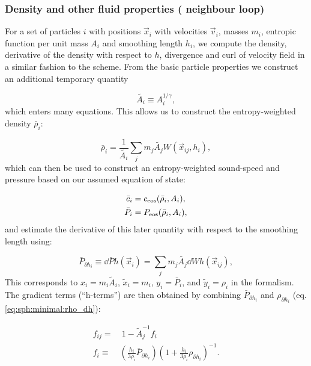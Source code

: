 \subsubsection{Density and other fluid properties ( neighbour loop)}

For a set of particles $i$ with positions $\vec{x}_i$ with velocities
$\vec{v}_i$, masses $m_i$, entropic function per unit mass $A_i$ and
smoothing length $h_i$, we compute the density, derivative of the
density with respect to $h$, divergence and curl of velocity field in
a similar fashion to the \GadgetSPH scheme. From the basic particle
properties we construct an additional temporary quantity

\begin{equation}
  \tilde{A_i} \equiv A_i^{1/\gamma},
    \label{eq:sph:pe:A_tilde}
\end{equation}
which enters many equations. This allows us to construct the
entropy-weighted density $\bar\rho_i$:

\begin{equation}
  \bar\rho_i = \frac{1}{\tilde{A_i}} \sum_j m_j \tilde{A_j} W(\vec{x}_{ij},
h_i),
  \label{eq:sph:pe:rho_bar}
\end{equation}
which can then be used to construct an entropy-weighted sound-speed
and pressure based on our assumed equation of state:

\begin{align}
  \bar c_i &= c_{\rm eos}(\bar\rho_i, A_i), \label{eq:sph:pe:c_bar}\\
  \bar P_i &= P_{\rm eos}(\bar\rho_i, A_i), \label{eq:sph:pe:P_bar}
\end{align}
and estimate the derivative of this later quantity with respect to the
smoothing length using:

\begin{equation}
\bar P_{\partial h_i} \equiv \dd{\bar{P}}{h}(\vec{x}_i) = \sum_j m_j
\tilde{A_j} \dd{W}{h}(\vec{x}_{ij}), \label{eq:sph:pe:P_dh}
\end{equation}
This corresponds to $x_i = m_i \tilde{A}_i$, $\tilde{x}_i = m_i$, $y_i =
\bar{P}_i$, and $\tilde{y}_i = \rho_i$ in the \citet{hopkins2013} formalism.
The gradient terms (``h-terms'') are then obtained by combining $\bar
P_{\partial h_i}$ and $\rho_{\partial h_i}$ (eq. \ref{eq:sph:minimal:rho_dh}):

\begin{align}
    f_{ij} = & ~ 1 - \tilde{A}_j^{-1} f_i \nonumber \\
    f_i \equiv &  \left(\frac{h_i}{3\rho_i}\bar P_{\partial
    h_i}\right)\left(1 + \frac{h_i}{3\rho_i}\rho_{\partial
    h_i}\right)^{-1}. 
\end{align}

